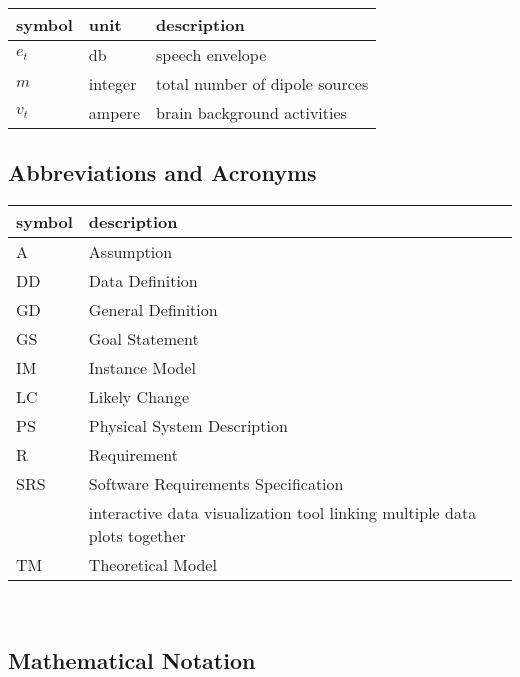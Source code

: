 \documentclass[12pt]{article}
\begin{document}
\renewcommand{\arraystretch}{1.2}
\noindent \begin{longtable*}{l l p{12cm}} \toprule
\textbf{symbol} & \textbf{unit} & \textbf{description}\\
\midrule 
$e_t$ & db & speech envelope\\
$m$ & integer & total number of dipole sources\\
$v_t$ & ampere & brain background activities\\

\bottomrule
\end{longtable*}

\subsection{Abbreviations and Acronyms}

\renewcommand{\arraystretch}{1.2}
\begin{tabular}{l l} 
  \toprule		
  \textbf{symbol} & \textbf{description}\\
  \midrule 
  A & Assumption\\
  DD & Data Definition\\
  GD & General Definition\\
  GS & Goal Statement\\
  IM & Instance Model\\
  LC & Likely Change\\
  PS & Physical System Description\\
  R & Requirement\\
  SRS & Software Requirements Specification\\
  \progname{} & interactive data visualization tool linking multiple data plots together\\
  TM & Theoretical Model\\
  \bottomrule
\end{tabular}\\
\subsection{Mathematical Notation}
\end{document}
